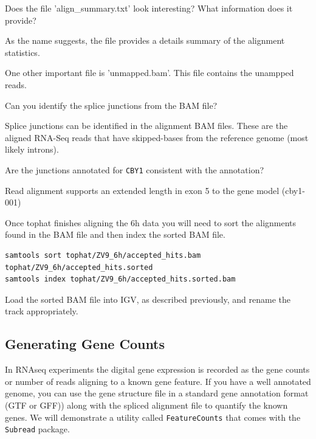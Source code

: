 \begin{questions}

Does the file 'align\_summary.txt' look interesting? What information does it provide?
\begin{answer}
As the name suggests, the file provides a details summary of the alignment statistics. 
\end{answer}
One other important file is 'unmapped.bam'. This file contains the unampped reads.

Can you identify the splice junctions from the BAM file?
\begin{answer}
Splice junctions can be identified in the alignment BAM files.
These are the aligned RNA-Seq reads that have skipped-bases from the reference genome (most likely introns).
\end{answer}

Are the junctions annotated for \texttt{CBY1} consistent with the annotation?
\begin{answer}
Read alignment supports an extended length in exon 5 to the gene model (cby1-001) 
\end{answer}


\end{questions}

\begin{steps}
Once tophat finishes aligning the 6h data you will need to sort the alignments found in the BAM file and then index the
sorted BAM file.

\begin{lstlisting}
samtools sort tophat/ZV9_6h/accepted_hits.bam tophat/ZV9_6h/accepted_hits.sorted
samtools index tophat/ZV9_6h/accepted_hits.sorted.bam
\end{lstlisting}

Load the sorted BAM file into IGV, as described previously, and rename the track appropriately.
\end{steps}

\subsection{Generating Gene Counts}

In RNAseq experiments the digital gene expression is recorded as the gene counts or number of reads aligning to a known gene feature. If you have a well annotated genome, you can use the gene structure file in a standard gene annotation format (GTF or GFF)) along with the spliced alignment file to quantify the known genes. We will demonstrate a utility called \texttt{FeatureCounts} that comes with the \texttt{Subread} package. 

